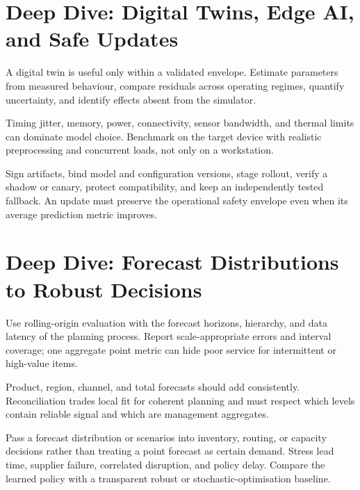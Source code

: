 \expandafter\def\csname almanachdeepdive@industrial-ai\endcsname{%
\section{Deep Dive: Digital Twins, Edge AI, and Safe Updates}
\begin{tcbitemize}[skin=sectionraster]
\tcbitem[title={Calibrate the Twin},raster multicolumn=3]
A digital twin is useful only within a validated envelope.
Estimate parameters from measured behaviour, compare residuals across operating
regimes, quantify uncertainty, and identify effects absent from the simulator.

\tcbitem[title={Edge Constraints Shape the Model},raster multicolumn=3]
Timing jitter, memory, power, connectivity, sensor bandwidth, and thermal limits
can dominate model choice.
Benchmark on the target device with realistic preprocessing and concurrent
loads, not only on a workstation.

\tcbitem[title={Safe Over-the-Air Change},raster multicolumn=6]
Sign artifacts, bind model and configuration versions, stage rollout, verify a
shadow or canary, protect compatibility, and keep an independently tested
fallback.
An update must preserve the operational safety envelope even when its average
prediction metric improves.
\end{tcbitemize}
}

\expandafter\def\csname almanachdeepdive@supply-chain\endcsname{%
\section{Deep Dive: Forecast Distributions to Robust Decisions}
\begin{tcbitemize}[skin=sectionraster]
\tcbitem[title={Evaluate at the Decision Horizon},raster multicolumn=3]
Use rolling-origin evaluation with the forecast horizons, hierarchy, and data
latency of the planning process.
Report scale-appropriate errors and interval coverage; one aggregate point
metric can hide poor service for intermittent or high-value items.

\tcbitem[title={Reconcile the Hierarchy},raster multicolumn=3]
Product, region, channel, and total forecasts should add consistently.
Reconciliation trades local fit for coherent planning and must respect which
levels contain reliable signal and which are management aggregates.

\tcbitem[title={Optimise Across Scenarios},raster multicolumn=6]
Pass a forecast distribution or scenarios into inventory, routing, or capacity
decisions rather than treating a point forecast as certain demand.
Stress lead time, supplier failure, correlated disruption, and policy delay.
Compare the learned policy with a transparent robust or stochastic-optimisation
baseline.
\end{tcbitemize}
}

